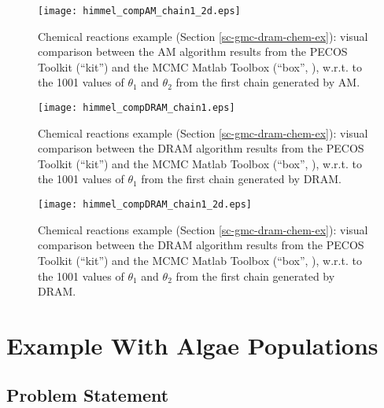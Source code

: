 \begin{figure}[h!]
\begin{center}
\texttt{[image: himmel\_compAM\_chain1\_2d.eps]}
\end{center}
\caption{Chemical reactions example (Section \ref{sc-gmc-dram-chem-ex}):
visual comparison between the AM algorithm results from the PECOS Toolkit (``kit'') and the MCMC Matlab Toolbox (``box'', \cite{mcmctool}), w.r.t. to the 1001 values of $\theta_1$ and $\theta_2$ from the first chain generated by AM.
}
\label{fig-dram-chem-ex-comparison-AM-theta1-chain1-2d}
\end{figure}

\begin{figure}[h!]
\begin{center}
\texttt{[image: himmel\_compDRAM\_chain1.eps]}
\end{center}
\caption{Chemical reactions example (Section \ref{sc-gmc-dram-chem-ex}):
visual comparison between the DRAM algorithm results from the PECOS Toolkit (``kit'') and the MCMC Matlab Toolbox (``box'', \cite{mcmctool}), w.r.t. to the 1001 values of $\theta_1$ from the first chain generated by DRAM.
}
\label{fig-dram-chem-ex-comparison-DRAM-theta1-chain1}
\end{figure}

\begin{figure}[h!]
\begin{center}
\texttt{[image: himmel\_compDRAM\_chain1\_2d.eps]}
\end{center}
\caption{Chemical reactions example (Section \ref{sc-gmc-dram-chem-ex}):
visual comparison between the DRAM algorithm results from the PECOS Toolkit (``kit'') and the MCMC Matlab Toolbox (``box'', \cite{mcmctool}), w.r.t. to the 1001 values of $\theta_1$ and $\theta_2$ from the first chain generated by DRAM.
}
\label{fig-dram-chem-ex-comparison-DRAM-theta1-chain1-2d}
\end{figure}

\clearpage

\section{Example With Algae Populations}\label{sc-gmc-dram-algae-ex}

\subsection{Problem Statement}
$~$\\

